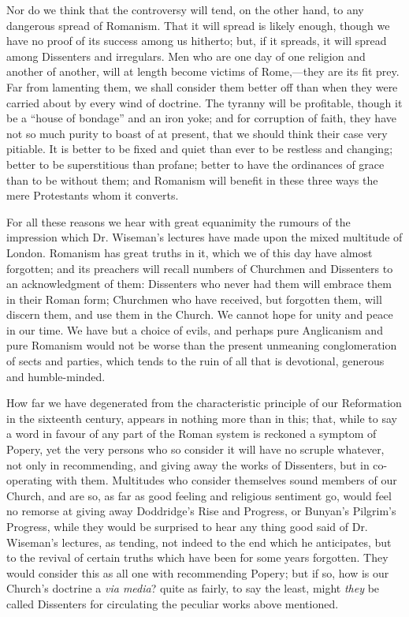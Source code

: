 Nor do we
think that the controversy will tend, on the other hand, to any
dangerous spread of Romanism. That it will spread is likely enough,
though we have no proof of its success among us hitherto; but, if it
spreads, it will spread among Dissenters and irregulars. Men who are one
day of one religion and another of another, will at length become
victims of Rome,—they are its fit prey. Far from lamenting them, we
shall consider them better off than when they were carried about by
every wind of doctrine. The tyranny will be profitable, though it be a ``house of bondage'' and an iron yoke; and for corruption of faith,
they have not so much purity to boast of at present, that we should
think their case very pitiable. It is better to be fixed and quiet than
ever to be restless and changing; better to be superstitious than
profane; better to have the ordinances of grace than to be without them;
and Romanism will benefit in these three ways the mere Protestants whom
it converts.

For all
these reasons we hear with great equanimity the rumours of the
impression which Dr. Wiseman's lectures have made upon the mixed
multitude of London. Romanism has great truths in it, which we of this
day have almost forgotten; and its preachers will recall numbers of
Churchmen and Dissenters to an acknowledgment of them: Dissenters who
never had them will embrace them in their Roman form; Churchmen who have
received, but forgotten them, will discern them, and use them in the
Church. We cannot hope for unity and peace in our time. We have but a
choice of evils, and perhaps pure Anglicanism and pure Romanism would
not be worse than the present unmeaning conglomeration of sects and
parties, which tends to the ruin of all that is devotional, generous and
humble-minded.

How far we
have degenerated from the characteristic principle of our Reformation in
the sixteenth century, appears in nothing more than in this; that, while
to say a word in favour of any part of the Roman system is reckoned a
symptom of Popery, yet the very persons who so consider it will have no
scruple whatever, not only in recommending, and giving away the works of
Dissenters, but in co-operating with them. Multitudes who consider
themselves sound members of our Church, and are so, as far as good
feeling and religious sentiment go, would feel no remorse at giving away
Doddridge's Rise and Progress, or Bunyan's Pilgrim's Progress,
while they would be surprised to hear any thing good said of Dr.
Wiseman's lectures, as tending, not indeed to the end which he
anticipates, but to the revival of certain truths which have been for
some years forgotten. They would consider this as all one with
recommending Popery; but if so, how is our Church's doctrine a \emph{via
media}? quite as fairly, to
say the least, might \emph{they} be called Dissenters for circulating
the peculiar works above mentioned.

